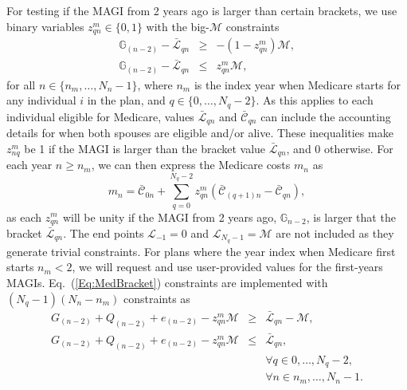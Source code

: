 \documentclass{report}[fleqn,12pt]
\begin{document}
        For testing if the MAGI from 2 years ago is larger than certain brackets,
	we use binary variables $z_{qn}^m \in \{0, 1\}$ with the big-$\mathcal{M}$ constraints
	\begin{eqnarray}
		\label{Eq:MedBracket}
                \mathbb{G}_{(n-2)} - \bar{\mathcal{L}}_{qn} & \geq & -(1 - z_{qn}^m) \mathcal{M}, \nonumber\\
                \mathbb{G}_{(n-2)} - \bar{\mathcal{L}}_{qn} & \leq & z_{qn}^m \mathcal{M},
	\end{eqnarray}
	for all $n \in \{n_m, \ldots, N_n-1\}$, where $n_{m}$ is the index year when
	Medicare starts for any individual $i$ in the plan, and $q \in \{0, \ldots, N_q -2\}$.
        As this applies to each individual eligible for Medicare, values
	$\bar{\mathcal{L}}_{qn}$ and  $\bar{\mathcal{C}}_{qn}$
	can include the accounting details for when both spouses are eligible and/or alive.
        These inequalities make $z_{nq}^m$ be 1 if
        the MAGI is larger than the bracket value $\bar{\mathcal{L}}_{qn}$, and 0 otherwise.
        For each year $n \geq n_m$, we can then express the Medicare costs $m_n$ as
	\begin{equation}
		\label{Eq:MediCosts}
		m_n = \bar{\mathcal{C}}_{0n}
                + \sum_{q=0}^{N_q -2} z_{qn}^m (\bar{\mathcal{C}}_{(q+1)n} - \bar{\mathcal{C}}_{qn}),
	\end{equation}
	as each $z_{qn}^m$ will be unity if the MAGI from 2 years ago, $\mathbb{G}_{n-2}$,
        is larger that the bracket $\bar{\mathcal{L}}_{qn}$.
	The end points $\mathcal{L}_{-1} = 0$ and $\mathcal{L}_{N_q-1} = \mathcal{M}$ are not included
        as they generate trivial constraints.
	For plans where the year index when Medicare first starts $n_m<2$, we will request
	and use user-provided values for the first-years MAGIs.
	Eq.~(\ref{Eq:MedBracket}) constraints are implemented
	with $(N_q -1)(N_n - n_m)$ constraints as
	\begin{eqnarray}
		\label{Eq:MedBracket2}
		G_{(n-2)} + Q_{(n-2)} + e_{(n-2)} - z_{qn}^m \mathcal{M}
                & \geq & \bar{\mathcal{L}}_{qn} - \mathcal{M}, \nonumber\\
		G_{(n-2)} + Q_{(n-2)} + e_{(n-2)} - z_{qn}^m \mathcal{M}
                & \leq & \bar{\mathcal{L}}_{qn}, \nonumber\\
		&&\forall q \in {0, \ldots, N_q-2},\nonumber \\
		&&\forall n \in {n_m, \ldots, N_n-1}.
	\end{eqnarray}
\end{document}
